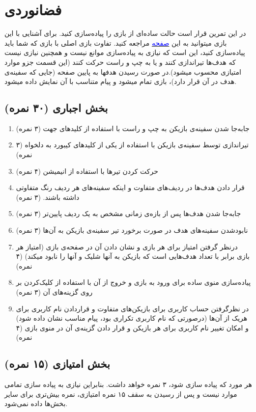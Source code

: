 \documentclass[]{article}
\begin{document}
\newpage


\section{فضانوردی}


در این تمرین قرار است حالت ساده‌ای از بازی  را پیاده‌سازی کنید. برای آشنایی با این بازی میتوانید به این 
\href{https://www.andoverpatio.co.uk/21/space-invaders/}{\textcolor{blue}{صفحه}}
 مراجعه کنید. تفاوت بازی اصلی با بازی که شما باید پیاده‌سازی کنید، این است که نیازی به پیاده‌سازی موانع نیست و همچنین نیازی نیست که هدف‌ها تیراندازی کنند و یا به چپ و راست حرکت کنند (این قسمت جزو موارد امتیازی محسوب میشود).در صورت رسیدن هدفها به پایین صفحه (جایی که سفینه‌ی هدف در آن قرار دارد)، بازی تمام میشود و پیام متناسب با آن نمایش داده میشود.

\subsection*{بخش اجباری (۳۰ نمره)}
\begin{enumerate}
\item جابه‌جا شدن سفینه‌ی بازیکن به چپ و راست با استفاده از کلیدهای جهت (۳ نمره)
\item تیراندازی توسط سفینه‌ی بازیکن با استفاده از یکی از کلیدهای کیبورد به دلخواه (۳ نمره)
\item حرکت کردن تیرها با استفاده از انیمیشن (۴ نمره)
\item قرار دادن هدف‌ها در ردیف‌های متفاوت و اینکه سفینه‌های هر ردیف رنگ متفاوتی داشته باشند. (۳ نمره)
\item جابه‌جا شدن هدف‌ها پس از بازه‌ی زمانی مشخص به یک ردیف پایین‌تر (۳ نمره)
\item نابودشدن سفینه‌های هدف در صورت برخورد تیر سفینه‌ی بازیکن به آن‌ها (۳ نمره)
\item درنظر گرفتن امتیاز برای هر بازی و نشان دادن آن در صفحه‌ی بازی (امتیاز هر بازی برابر با تعداد هدف‌هایی است که بازیکن به آنها شلیک و آنها را نابود میکند) (۴ نمره)
\item پیاده‌سازی منوی ساده برای ورود به بازی و خروج از آن با استفاده از کلیک‌کردن بر روی گزینه‌های آن (۳ نمره)
\item در نظرگرفتن حساب کاربری برای بازیکن‌های متفاوت و قراردادن نام کاربری برای هریک از آن‌ها (درصورتی که نام کاربری تکراری بود، پیام مناسب نشان داده شود) و امکان تغییر نام کاربری برای هر بازیکن و قرار دادن گزینه‌ی آن در منوی بازی (۴ نمره)
\end{enumerate}
\subsection*{بخش امتیازی (۱۵ نمره)}
هر مورد که پیاده سازی شود، ۳ نمره خواهد داشت. بنابراین نیازی به پیاده سازی تمامی موارد نیست و پس از رسیدن به سقف ۱۵ نمره امتیازی، نمره بیش‌تری برای سایر بخش‌ها داده نمی‌شود.
\end{document}
